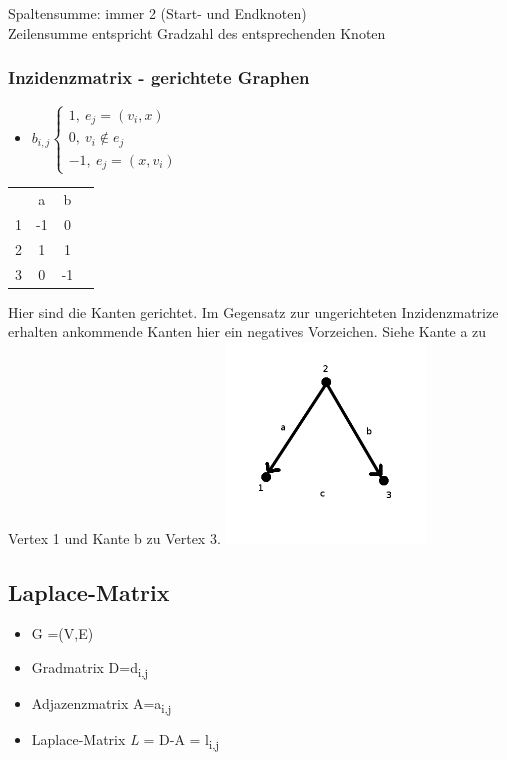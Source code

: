 Spaltensumme: immer 2 (Start- und Endknoten)\\
Zeilensumme entspricht Gradzahl des entsprechenden Knoten

\subsubsection{Inzidenzmatrix - gerichtete Graphen}
\begin{itemize}
	\item $b_{i,j}
	\begin{cases}
		1,\>e_j=(v_i,x)\\
		0,\>v_i \notin e_j\\
		-1,\>e_j=(x,v_i)\end{cases}$
\end{itemize}

\begin{tabular}{cccc}
 & a & b\\
1 & -1 & 0\\
2 & 1 & 1\\
3 & 0 & -1\\
\end{tabular}\newline\newline
Hier sind die Kanten gerichtet. Im Gegensatz zur ungerichteten Inzidenzmatrize erhalten \glqq ankommende\grqq{} Kanten hier ein negatives Vorzeichen. Siehe Kante a zu Vertex 1 und Kante b zu Vertex 3.\newline
\includegraphics[width=0.4\textwidth]{lectures/161028/pix/dreieckge.png}

\newpage

\subsection{Laplace-Matrix}
\begin{itemize}
	\item G =(V,E)
	\item Gradmatrix D=d\textsubscript{i,j}
	\item Adjazenzmatrix A=a\textsubscript{i,j}
	\item Laplace-Matrix \textit L = D-A = l\textsubscript{i,j}
\end{itemize}

